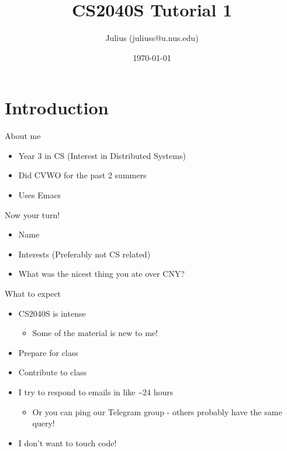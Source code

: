 \documentclass[presentation]{beamer}
\author{Julius (juliuss@u.nus.edu)}
\date{\today}
\title{CS2040S Tutorial 1}
\begin{document}
\maketitle

\section{Introduction}
\label{sec:orgf443f62}
\begin{frame}[<+->][label={sec:org6a824d7}]{About me}
\begin{itemize}
\item Year 3 in CS (Interest in Distributed Systems)
\item Did CVWO for the past 2 summers
\item Uses Emacs
\end{itemize}
\end{frame}
\begin{frame}[label={sec:org1bf68b1}]{Now your turn!}
\begin{itemize}
\item Name
\item Interests (Preferably not CS related)
\item What was the nicest thing you ate over CNY?
\end{itemize}
\end{frame}
\begin{frame}[<+->][label={sec:org4e8e6c1}]{What to expect}
\begin{itemize}
\item CS2040S is intense
\begin{itemize}
\item Some of the material is new to me!
\end{itemize}
\item Prepare for class
\item Contribute to class
\item I try to respond to emails in like \textasciitilde{}24 hours
\begin{itemize}
\item Or you can ping our Telegram group - others probably have the
same query!
\end{itemize}
\item I don't want to touch code!
\end{itemize}
\end{frame}
\end{document}
